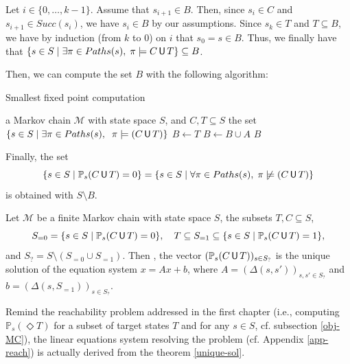 \begin{proof2}
\begin{enumerate}
    Let $i \in \{0, \dots, k-1\}$.
    Assume that $s_{i+1} \in B$. Then, since $s_i \in C$ and $s_{i+1} \in Succ(s_i)$, we have $s_i \in B$ by our assumptions.
  Since $s_k \in T$ and $T \subseteq B$, we have by induction (from $k$ to $0$) on $i$ that $s_0=s \in B$.
  Thus, we finally have that $\{s \in S \; | \; \exists \pi \in Paths(s), \; \pi \models C \,\text{\sffamily U}\, T\} \subseteq B$.
\end{enumerate}
Then, we can compute the set $B$ with the following algorithm:
\begin{algorithm}[H]
\caption{Smallest fixed point computation}
\begin{algorithmic}[1]
  \REQUIRE a Markov chain $\mathcal{M}$ with state space $S$, and $C, T \subseteq S$
  \ENSURE the set $\{ s \in S \; | \; \exists \pi \in Paths(s), \;\; \pi \models (C \,\text{\sffamily U}\, T) \}$
  \STATE $B \leftarrow T$
    \STATE $B \leftarrow B \cup A$
  \ENDWHILE
  \RETURN $B$
\end{algorithmic}
\end{algorithm}
Finally, the set \[\{s \in S \; | \; \mathbb{P}_s(C \U T) = 0 \} = \{s \in S \; | \; \forall \pi \in Paths(s), \; \pi \centernot \models (C \U T) \}\] is obtained with $S \setminus B$.
\end{proof2}

\begin{theorem} \label{unique-sol}
Let $\mathcal{M}$ be a finite Markov chain with state space $S$, the subsets $T, C \subseteq S$,
\[
  S_{=0} = \{s \in S \; | \; \mathbb{P}_s(C \,\text{\sffamily U}\, T) = 0 \}, \quad
  T \subseteq S_{=1} \subseteq \{s \in S \; | \; \mathbb{P}_s(C \,\text{\sffamily U}\, T) = 1 \},
\]
and $S_? = S \setminus (S_{=0} \cup S_{=1})$. Then , the vector $(\mathbb{P}_s(C \,\text{\sffamily U}\, T))_{s \in S_?}$ is the unique solution of the equation system $x = Ax+b$, where $A = (\Delta(s, s'))_{s, s' \in S_?}$ and $b = (\Delta(s, S_{=1}))_{s \in S_?}$.
\end{theorem}

\begin{remark}
  Remind the reachability problem addressed in the first chapter (i.e., computing $\mathbb{P}_s(\Diamond T)$ for a subset of target states $T$ and for any $s \in S$, cf. subsection \ref{obj-MC}), the linear equations system resolving the problem (cf. Appendix \ref{app-reach}) is actually derived from the theorem \ref{unique-sol}.
\end{remark}


